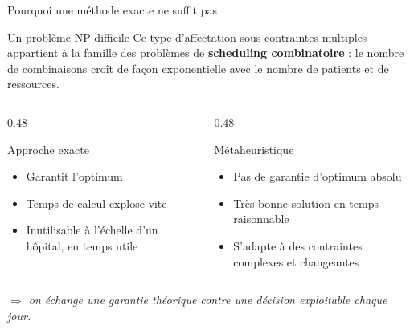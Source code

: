 \begin{frame}{Pourquoi une méthode exacte ne suffit pas}
  \begin{block}{Un problème NP-difficile}
    Ce type d'affectation sous contraintes multiples appartient à la famille
    des problèmes de \textbf{scheduling combinatoire} : le nombre de
    combinaisons croît de façon exponentielle avec le nombre de patients et de
    ressources.
  \end{block}
  \begin{columns}[T]
    \begin{column}{0.48\textwidth}
      \begin{block}{Approche exacte}
        \begin{itemize}
          \item Garantit l'optimum
          \item Temps de calcul explose vite
          \item Inutilisable à l'échelle d'un hôpital, en temps utile
        \end{itemize}
      \end{block}
    \end{column}
    \begin{column}{0.48\textwidth}
      \begin{block}{Métaheuristique}
        \begin{itemize}
          \item Pas de garantie d'optimum absolu
          \item Très bonne solution en temps raisonnable
          \item S'adapte à des contraintes complexes et changeantes
        \end{itemize}
      \end{block}
    \end{column}
  \end{columns}
  \centering
  \textit{$\Rightarrow$ on échange une garantie théorique contre une décision
  exploitable chaque jour.}
\end{frame}

